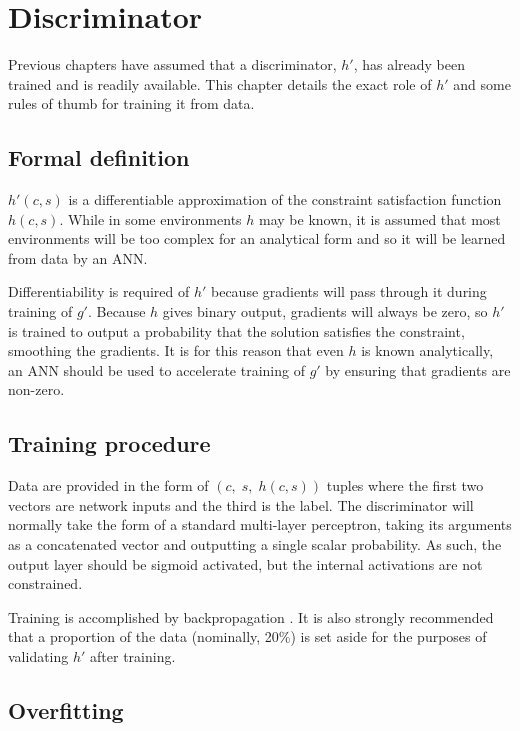 \documentclass[../../main.tex]{subfiles}
\begin{document}
\chapter{Discriminator} \label{chapter:discriminator}

Previous chapters have assumed that a discriminator, $h'$, has already been trained and is readily available.
This chapter details the exact role of $h'$ and some rules of thumb for training it from data.

\section{Formal definition} \label{section:formalDefinition}

$h'(c,s)$ is a differentiable approximation of the constraint satisfaction function $h(c,s)$.
While in some environments $h$ may be known, it is assumed that most environments will be too complex for an analytical form and so it will be learned from data by an ANN.

Differentiability is required of $h'$ because gradients will pass through it during training of $g'$.
Because $h$ gives binary output, gradients will always be zero, so $h'$ is trained to output a probability that the solution satisfies the constraint, smoothing the gradients.
It is for this reason that even $h$ is known analytically, an ANN should be used to accelerate training of $g'$ by ensuring that gradients are non-zero.

\section{Training procedure} \label{section:discriminatorTrainingProcedure}

Data are provided in the form of $(c,\;s,\;h(c,s))$ tuples where the first two vectors are network inputs and the third is the label.
The discriminator will normally take the form of a standard multi-layer perceptron, taking its arguments as a concatenated vector and outputting a single scalar probability.
As such, the output layer should be sigmoid activated, but the internal activations are not constrained.

Training is accomplished by backpropagation \cite{rumelhart86}.
It is also strongly recommended that a proportion of the data (nominally, 20\%) is set aside for the purposes of validating $h'$ after training.

\section{Overfitting} \label{section:overfitting}
\end{document}
